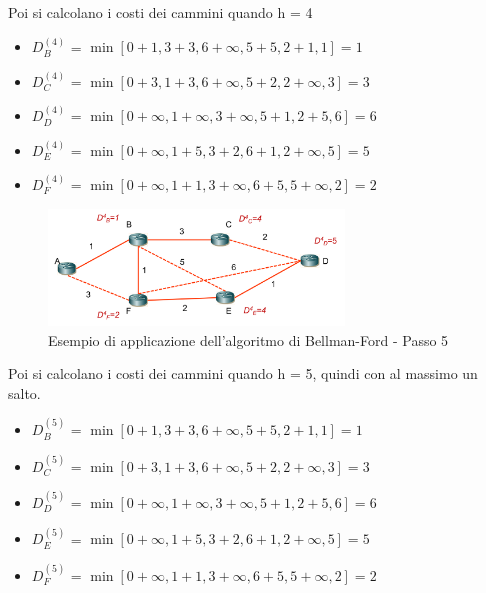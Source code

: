 Poi si calcolano i costi dei cammini quando h = 4

\begin{itemize}
   
    \item $D_B^{(4)}$ =  $\min [0 + 1, 3 + 3, 6 + \infty, 5 + 5, 2 + 1, 1] = 1$
    \item $D_C^{(4)}$ = $\min [0 + 3, 1 + 3, 6 + \infty, 5 + 2, 2 + \infty, 3] = 3$
    \item $D_D^{(4)}$ = $\min [0 + \infty, 1 + \infty, 3 + \infty, 5 + 1, 2 + 5, 6] = 6$
    \item $D_E^{(4)}$ = $\min [0 + \infty, 1 + 5, 3 + 2, 6 + 1, 2 + \infty, 5] = 5$
    \item $D_F^{(4)}$ = $\min [0 + \infty, 1 + 1, 3 + \infty, 6 + 5, 5 + \infty, 2] = 2$
\end{itemize}

\begin{figure}[h!]
    \centering
    \includegraphics[width=0.7\textwidth]{images/bf5.png}
    \caption{Esempio di applicazione dell'algoritmo di Bellman-Ford - Passo 5}
    \label{fig:bf5}
\end{figure}
\newpage
Poi si calcolano i costi dei cammini quando h = 5, quindi con al massimo un salto.

\begin{itemize}
   
    \item $D_B^{(5)}$ = $\min [0 + 1, 3 + 3, 6 + \infty, 5 + 5, 2 + 1, 1] = 1$
    
    \item $D_C^{(5)}$ = $\min [0 + 3, 1 + 3, 6 + \infty, 5 + 2, 2 + \infty, 3] = 3$
    
    \item $D_D^{(5)}$ = $\min [0 + \infty, 1 + \infty, 3 + \infty, 5 + 1, 2 + 5, 6] = 6$
    
    \item $D_E^{(5)}$ = $\min [0 + \infty, 1 + 5, 3 + 2, 6 + 1, 2 + \infty, 5] = 5$
    
    \item $D_F^{(5)}$ = $\min [0 + \infty, 1 + 1, 3 + \infty, 6 + 5, 5 + \infty, 2] = 2$
\end{itemize}


